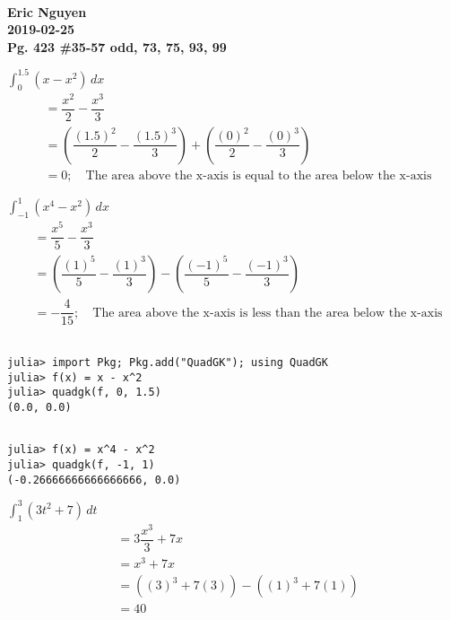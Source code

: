 \documentclass[12pt]{article}
\newenvironment{problem}[2][]{
    \begin{trivlist}
        \item[
            {\bfseries #1}
            {\bfseries #2.}
        ]
}{\end{trivlist}}
\newcommand{\assignment}{Pg. 423 \#35-57 odd, 73, 75, 93, 99}
\newcommand{\name}{Eric Nguyen}
\newcommand{\duedate}{2019-02-25}
\newcommand{\details}{\textbf{\\\name \\\duedate \\\assignment}}
\begin{document}
\details

\begin{problem}{35}
$\displaystyle\int_0^{1.5} (x - x^2) \, dx$
\begin{align}
&= \dfrac{x^2}{2} - \dfrac{x^3}{3} \\
&= \left(\dfrac{(1.5)^2}{2} - \dfrac{(1.5)^3}{3}\right) + \left(\dfrac{(0)^2}{2} - \dfrac{(0)^3}{3}\right) \\
&= 0; \quad \text{The area above the x-axis is equal to the area below the x-axis}
\end{align}
\end{problem}

\begin{problem}{37}
$\displaystyle\int_{-1}^1 (x^4 - x^2) \, dx$
\begin{align}
&= \dfrac{x^5}{5} - \dfrac{x^3}{3} \\
&= \left(\dfrac{(1)^5}{5} - \dfrac{(1)^3}{3}\right) - \left(\dfrac{(-1)^5}{5} - \dfrac{(-1)^3}{3}\right) \\
&= -\dfrac{4}{15}; \quad \text{The area above the x-axis is less than the area below the x-axis} 
\end{align}
\end{problem}

\begin{problem}{39}
\begin{verbatim}

julia> import Pkg; Pkg.add("QuadGK"); using QuadGK
julia> f(x) = x - x^2
julia> quadgk(f, 0, 1.5)
(0.0, 0.0)
\end{verbatim}
\end{problem}

\begin{problem}{41}
\begin{verbatim}

julia> f(x) = x^4 - x^2
julia> quadgk(f, -1, 1)
(-0.26666666666666666, 0.0)
\end{verbatim}
\end{problem}

\begin{problem}{43}
$\displaystyle\int_1^3 (3t^2 + 7) \, dt$
\begin{align}
&= 3\dfrac{x^3}{3} + 7x \\
&= x^3 + 7x \\
&= ((3)^3 + 7(3)) - ((1)^3 + 7(1)) \\
&= 40
\end{align}
\end{problem}
\end{document}
